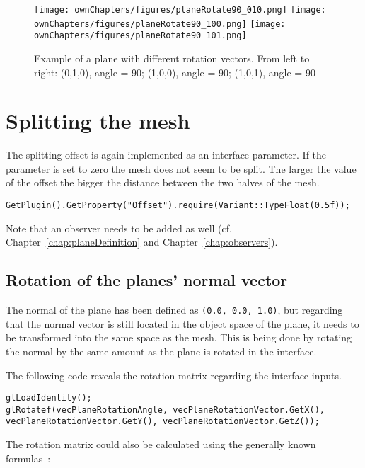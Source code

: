 \begin{figure}%
\centering
\texttt{[image: ownChapters/figures/planeRotate90\_010.png]}%
\hspace{5.00mm}
\texttt{[image: ownChapters/figures/planeRotate90\_100.png]}%
\hspace{5.00mm}
\texttt{[image: ownChapters/figures/planeRotate90\_101.png]}%
\caption{Example of a plane with different rotation vectors. From left to right: (0,1,0), angle = 90; (1,0,0), angle = 90; (1,0,1), angle = 90}%
\label{fig:plane}%
\end{figure}

\section{Splitting the mesh}
The splitting offset is again implemented as an interface parameter. If the parameter is set to zero the mesh does not seem to be split. The larger the value of the offset the bigger the distance between the two halves of the mesh.
\begin{lstlisting}
GetPlugin().GetProperty("Offset").require(Variant::TypeFloat(0.5f));
\end{lstlisting}

Note that an observer needs to be added as well (cf. Chapter~\ref{chap:planeDefinition} and Chapter~\ref{chap:observers}).

\subsection{Rotation of the planes' normal vector}
The normal of the plane has been defined as \texttt{(0.0, 0.0, 1.0)}, but regarding that the normal vector is still located in the object space of the plane, it needs to be transformed into the same space as the mesh. This is being done by rotating the normal by the same amount as the plane is rotated in the interface.

The following code reveals the rotation matrix regarding the interface inputs.
\begin{lstlisting}
glLoadIdentity();
glRotatef(vecPlaneRotationAngle, vecPlaneRotationVector.GetX(), vecPlaneRotationVector.GetY(), vecPlaneRotationVector.GetZ());
\end{lstlisting}

The rotation matrix could also be calculated using the generally known formulas~\cite{book:computerGraphicsHill}:\\%

